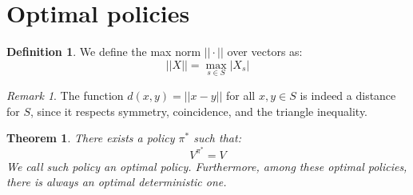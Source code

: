 \documentclass{article}
\newtheorem{theorem}{Theorem}[section]
\theoremstyle{definition}
\newtheorem{definition}{Definition}[section]
\theoremstyle{remark}
\newtheorem*{remark}{Remark}
\theoremstyle{example}
\begin{document}
\section{Optimal policies}

\begin{definition}
    We define the max norm $||\cdot||$ over vectors as:
        $$||X|| = \max_{s \in S} |X_s|$$
\end{definition}

\begin{remark}
    The function $d(x, y) = ||x - y||$ for all $x, y \in S$ is indeed a distance for $S$, since it respects symmetry, coincidence, and the triangle inequality.
\end{remark}

\begin{theorem}
		There exists a policy $\pi^*$ such that:
				$$V^{\pi^*} = V$$
		We call such policy an optimal policy. Furthermore, among these optimal policies, there is always an optimal \textit{deterministic} one.
\end{theorem}
\end{document}
